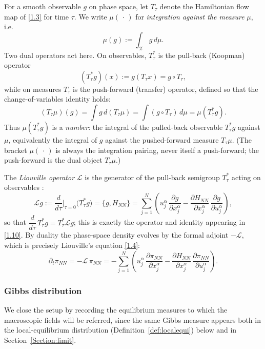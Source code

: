 \documentclass[11pt]{article}
\begin{document}
For a smooth observable $g$ on phase space, let $T_\tau$ denote the
Hamiltonian flow map of \eqref{1.3} for time $\tau$. We write
$\mu(\,\cdot\,)$ for \emph{integration against the measure} $\mu$, i.e.
\[
\mu(g):=\int_{\mathcal X} g\,d\mu .
\]
Two dual operators act here. On observables, $T_\tau^{*}$ is the pull-back
(Koopman) operator
\[
(T_\tau^{*}g)(x):=g(T_\tau x)=g\circ T_\tau ,
\]
while on measures $T_\tau$ is the push-forward (transfer) operator, defined
so that the change-of-variables identity holds:
\begin{equation}\label{duality}\tag{1.7}
(T_\tau\mu)(g)=\int g\,d(T_\tau\mu)=\int (g\circ T_\tau)\,d\mu=\mu(T_\tau^{*}g).
\end{equation}
Thus $\mu(T_\tau^{*}g)$ is a \emph{number}: the integral of the pulled-back
observable $T_\tau^{*}g$ against $\mu$, equivalently the integral of $g$
against the pushed-forward measure $T_\tau\mu$. (The bracket $\mu(\,\cdot\,)$
is always the integration pairing, never itself a push-forward; the
push-forward is the dual object $T_\tau\mu$.)

The \emph{Liouville operator} $\mathcal L$ is the generator of the pull-back
semigroup $T_\tau^{*}$ acting on observables \cite{CIP1994}:
\begin{equation}\label{Liouvilleop}\tag{1.8}
\mathcal L g
:=\frac{d}{d\tau}\Big|_{\tau=0}\!\big(T_\tau^{*}g\big)
=\{g,H_{NN}\}
=\sum_{j=1}^N\left(u_j^\alpha\,\frac{\partial g}{\partial x_j^\alpha}
-\frac{\partial H_{NN}}{\partial x_j^\alpha}\,\frac{\partial g}{\partial u_j^\alpha}\right),
\end{equation}
so that $\dfrac{d}{d\tau}\,T_\tau^{*}g=T_\tau^{*}\mathcal L g$; this is exactly
the operator and identity appearing in \eqref{1.10}. By duality the phase-space
density evolves by the formal adjoint $-\mathcal L$, which is precisely
Liouville's equation \eqref{1.4}:
\[
\partial_t\pi_{NN}=-\mathcal L\,\pi_{NN}
=-\sum_{j=1}^N\left(u_j^\alpha\,\frac{\partial \pi_{NN}}{\partial x_j^\alpha}
-\frac{\partial H_{NN}}{\partial x_j^\alpha}\,\frac{\partial \pi_{NN}}{\partial u_j^\alpha}\right).
\]

\subsubsection{Gibbs distribution}
\medskip

We close the setup by recording the equilibrium measures to which the
macroscopic fields will be referred, since the same Gibbs measure appears both
in the local-equilibrium distribution (Definition~\ref{def:localequi}) below and in Section~\ref{Section:limit}. 
\end{document}
